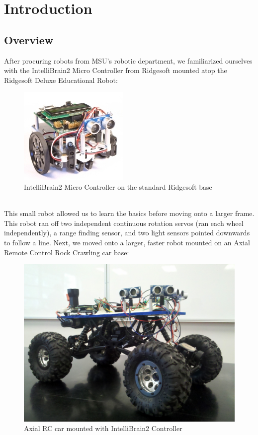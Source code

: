 \documentclass[12pt]{article}
\begin{document}
 


\onehalfspacing

\setcounter{page}{1}
\setlength{\headheight}{15pt} \pagestyle{fancyplain}
\rhead{\fancyplain{}{\small{\textit{\leftmark}}}}\cfoot{\small{\thepage}}
\section{Introduction}
\subsection{Overview}
After procuring robots from MSU's robotic department, we familiarized ourselves with the IntelliBrain2 Micro Controller from Ridgesoft mounted atop the Ridgesoft Deluxe Educational Robot:\\
\begin{figure}[h]
\centerline{\includegraphics[scale=.5]{img/smallBot}}
\caption{IntelliBrain2 Micro Controller on the standard Ridgesoft base}
\end{figure}\\
This small robot allowed us to learn the basics before moving onto a larger frame.  This robot ran off two independent continuous rotation servos (ran each wheel independently), a range finding sensor, and two light sensors pointed downwards to follow a line.  Next, we moved onto a larger, faster robot mounted on an Axial Remote Control Rock Crawling car base:
\begin{figure}[h]
\centerline{\includegraphics{img/bigBot1}}
\caption{Axial RC car mounted with IntelliBrain2 Controller}
\end{figure}
\end{document}
